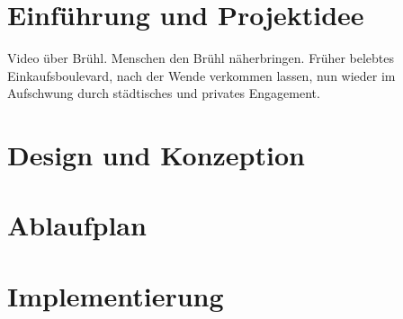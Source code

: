 \chapter{Einführung und Projektidee}
Video über Brühl. Menschen den Brühl näherbringen. Früher belebtes Einkaufsboulevard, nach der Wende verkommen lassen, nun wieder im Aufschwung durch städtisches und privates Engagement.
\chapter{Design und Konzeption}
\chapter{Ablaufplan}
\chapter{Implementierung}
